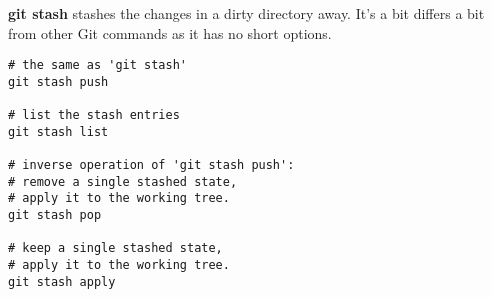 %

\textbf{git stash} stashes the changes in a dirty directory away.
It's a bit differs a bit from other Git commands as it has no short options.

\begin{verbatim}
# the same as 'git stash'
git stash push

# list the stash entries
git stash list

# inverse operation of 'git stash push':
# remove a single stashed state,
# apply it to the working tree.
git stash pop

# keep a single stashed state,
# apply it to the working tree.
git stash apply
\end{verbatim}

%